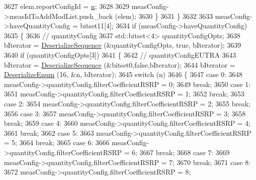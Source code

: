\begin{DoxyCode}
3627           elem.reportConfigId = \hyperlink{namespacesample-rng-plot_aeb5ee5c431e338ef39b7ac5431242e1d}{n};
3628 
3629           measConfig->measIdToAddModList.push\_back (elem);
3630         \}
3631     \}
3632 
3633   measConfig->haveQuantityConfig = bitset11[4];
3634   \textcolor{keywordflow}{if} (measConfig->haveQuantityConfig)
3635     \{
3636       \textcolor{comment}{// quantityConfig}
3637       std::bitset<4> quantityConfigOpts;
3638       bIterator = \hyperlink{classns3_1_1Asn1Header_a58c68bb97ba3fe2e8fcdd7c208d672b2}{DeserializeSequence} (&quantityConfigOpts, \textcolor{keyword}{true}, bIterator);
3639 
3640       \textcolor{keywordflow}{if} (quantityConfigOpts[3])
3641         \{
3642           \textcolor{comment}{// quantityConfigEUTRA}
3643           bIterator = \hyperlink{classns3_1_1Asn1Header_a58c68bb97ba3fe2e8fcdd7c208d672b2}{DeserializeSequence} (&bitset0,\textcolor{keyword}{false},bIterator);
3644           bIterator = \hyperlink{classns3_1_1Asn1Header_a4fcc253e0eec3483c775b005c1875f2d}{DeserializeEnum} (16, &n, bIterator);
3645           \textcolor{keywordflow}{switch} (n)
3646             \{
3647             \textcolor{keywordflow}{case} 0:
3648               measConfig->quantityConfig.filterCoefficientRSRP = 0;
3649               \textcolor{keywordflow}{break};
3650             \textcolor{keywordflow}{case} 1:
3651               measConfig->quantityConfig.filterCoefficientRSRP = 1;
3652               \textcolor{keywordflow}{break};
3653             \textcolor{keywordflow}{case} 2:
3654               measConfig->quantityConfig.filterCoefficientRSRP = 2;
3655               \textcolor{keywordflow}{break};
3656             \textcolor{keywordflow}{case} 3:
3657               measConfig->quantityConfig.filterCoefficientRSRP = 3;
3658               \textcolor{keywordflow}{break};
3659             \textcolor{keywordflow}{case} 4:
3660               measConfig->quantityConfig.filterCoefficientRSRP = 4;
3661               \textcolor{keywordflow}{break};
3662             \textcolor{keywordflow}{case} 5:
3663               measConfig->quantityConfig.filterCoefficientRSRP = 5;
3664               \textcolor{keywordflow}{break};
3665             \textcolor{keywordflow}{case} 6:
3666               measConfig->quantityConfig.filterCoefficientRSRP = 6;
3667               \textcolor{keywordflow}{break};
3668             \textcolor{keywordflow}{case} 7:
3669               measConfig->quantityConfig.filterCoefficientRSRP = 7;
3670               \textcolor{keywordflow}{break};
3671             \textcolor{keywordflow}{case} 8:
3672               measConfig->quantityConfig.filterCoefficientRSRP = 8;

\end{DoxyCode}
